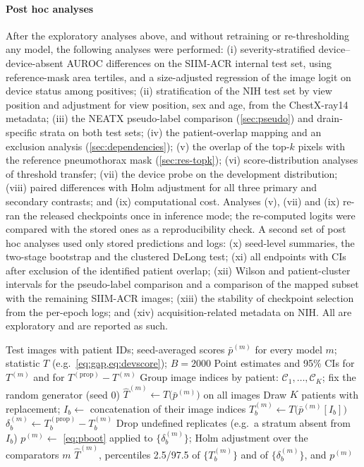 \documentclass{ieeeaccess}
\begin{document}
\paragraph{Post hoc analyses} After the exploratory analyses above, and without retraining or re-thresholding any model, the following analyses were performed: (i) severity-stratified device--device-absent AUROC differences on the SIIM-ACR internal test set, using reference-mask area tertiles, and a size-adjusted regression of the image logit on device status among positives; (ii) stratification of the NIH test set by view position and adjustment for view position, sex and age, from the ChestX-ray14 metadata; (iii) the NEATX pseudo-label comparison (\cref{sec:pseudo}) and drain-specific strata on both test sets; (iv) the patient-overlap mapping and an exclusion analysis (\cref{sec:dependencies}); (v) the overlap of the top-$k$ pixels with the reference pneumothorax mask (\cref{sec:res-topk}); (vi) score-distribution analyses of threshold transfer; (vii) the device probe on the development distribution; (viii) paired differences with Holm adjustment for all three primary and secondary contrasts; and (ix) computational cost. Analyses (v), (vii) and (ix) re-ran the released checkpoints once in inference mode; the re-computed logits were compared with the stored ones as a reproducibility check. A second set of post hoc analyses used only stored predictions and logs: (x) seed-level summaries, the two-stage bootstrap and the clustered DeLong test; (xi) all endpoints with CIs after exclusion of the identified patient overlap; (xii) Wilson and patient-cluster intervals for the pseudo-label comparison and a comparison of the mapped subset with the remaining SIIM-ACR images; (xiii) the stability of checkpoint selection from the per-epoch logs; and (xiv) acquisition-related metadata on NIH. All are exploratory and are reported as such.


\begin{algorithm}[!t]
\caption{Patient-cluster bootstrap for CIs and paired differences}
\label{alg:boot}
\begin{algorithmic}[1]
\Require Test images with patient IDs; seed-averaged scores $\bar p^{(m)}$ for every model $m$; statistic $T$ (e.g.\ \cref{eq:gap,eq:devscore}); $B=2000$
\Ensure Point estimates and 95\% CIs for $T^{(m)}$ and for $T^{(\text{prop})}-T^{(m)}$
\State Group image indices by patient: $\mathcal{C}_1,\dots,\mathcal{C}_K$; fix the random generator (seed 0)
\State $\hat T^{(m)}\gets T\big(\bar p^{(m)}\big)$ on all images
  \State Draw $K$ patients with replacement; $I_b\gets$ concatenation of their image indices
   \State $T^{(m)}_b\gets T\big(\bar p^{(m)}[I_b]\big)$ 
  \EndFor
  \State $\delta^{(m)}_b\gets T^{(\text{prop})}_b-T^{(m)}_b$
\EndFor
\State Drop undefined replicates (e.g.\ a stratum absent from $I_b$)
\State $p^{(m)}\gets$ \cref{eq:pboot} applied to $\{\delta^{(m)}_b\}$; Holm adjustment over the comparators $m$
\State \Return $\hat T^{(m)}$, percentiles 2.5/97.5 of $\{T^{(m)}_b\}$ and of $\{\delta^{(m)}_b\}$, and $p^{(m)}$
\end{algorithmic}
\end{algorithm}
\end{document}
